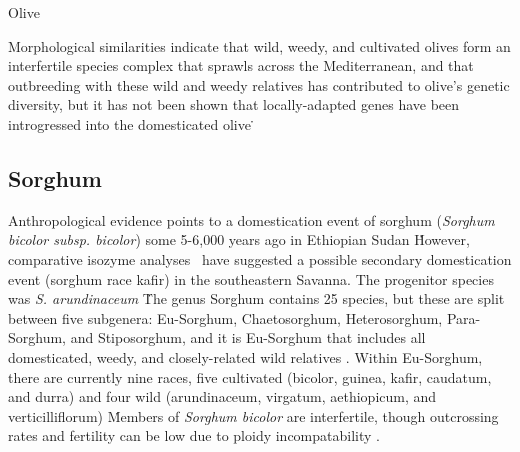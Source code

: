 \documentclass[11pt]{article}
\begin{document}
Olive

Morphological similarities indicate that wild, weedy, and cultivated olives form an interfertile species complex that sprawls across the Mediterranean, and that outbreeding with these wild and weedy relatives has contributed to olive's genetic diversity, but it has not been shown that locally-adapted genes have been introgressed into the domesticated olive \cite{zohary1975beginnings}\.



















\subsection*{Sorghum}
Anthropological evidence points to a domestication event of sorghum (\emph{Sorghum bicolor subsp. bicolor}) some 5-6,000 years ago in Ethiopian Sudan \cite{smith2000sorghum}\.
However, comparative isozyme analyses \cite{shechter1975comparative}\ have suggested a possible secondary domestication event (sorghum race kafir) in the southeastern Savanna.
The progenitor species was \emph{S. arundinaceum} \cite{doggett1988sorghum, harlan1971toward}\.
The genus Sorghum contains 25 species, but these are split between five subgenera: Eu-Sorghum, Chaetosorghum, Heterosorghum, Para-Sorghum, and Stiposorghum, and it is Eu-Sorghum that includes all domesticated, weedy, and closely-related wild relatives \cite{USDAARS2007, garber1950cytotaxonomic}.
Within Eu-Sorghum, there are currently nine races, five cultivated (bicolor, guinea, kafir, caudatum, and durra) and four wild (arundinaceum, virgatum, aethiopicum, and verticilliflorum) \cite{smith2000sorghum}\.
Members of \emph{Sorghum bicolor} are interfertile, though outcrossing rates and fertility can be low due to ploidy incompatability \cite{doggett1988sorghum, arriola1996crop}.
\end{document}
